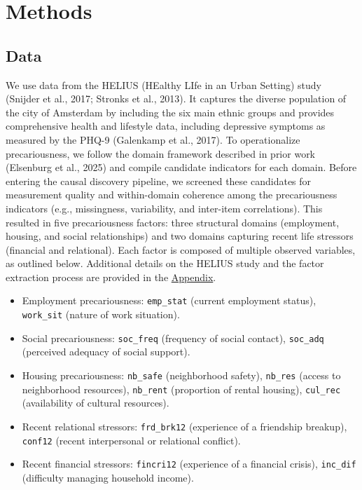\documentclass[
]{article}
\providecommand{\tightlist}{%
  \setlength{\itemsep}{0pt}\setlength{\parskip}{0pt}}\usepackage{longtable,booktabs,array}
\begin{document}
\section{Methods}\label{methods}

\subsection{Data}\label{data}

We use data from the HELIUS (HEalthy LIfe in an Urban Setting) study
(Snijder et al., 2017; Stronks et al., 2013). It captures the diverse
population of the city of Amsterdam by including the six main ethnic
groups and provides comprehensive health and lifestyle data, including
depressive symptoms as measured by the PHQ-9 (Galenkamp et al., 2017).
\textcolor{BrickRed}{To operationalize precariousness, we follow the domain framework described in prior work}
(Elsenburg et al., 2025)
\textcolor{BrickRed}{and compile candidate indicators for each domain. Before entering the causal discovery pipeline, we screened these candidates for measurement quality and within-domain coherence among the precariousness indicators (e.g., missingness, variability, and inter-item correlations). 
This resulted in five precariousness factors: three structural domains (employment, housing, and social relationships) and two domains capturing recent life stressors (financial and relational). Each factor is composed of multiple observed variables, as outlined below. Additional details on the HELIUS study and the factor extraction process are provided in the}
\hyperref[sec-appendix]{Appendix}.

\begin{itemize}
\tightlist
\item
  Employment precariousness: \texttt{emp\_stat} (current employment
  status), \texttt{work\_sit} (nature of work situation).
\item
  Social precariousness: \texttt{soc\_freq} (frequency of social
  contact), \texttt{soc\_adq} (perceived adequacy of social support).
\item
  Housing precariousness: \texttt{nb\_safe} (neighborhood safety),
  \texttt{nb\_res} (access to neighborhood resources), \texttt{nb\_rent}
  (proportion of rental housing), \texttt{cul\_rec} (availability of
  cultural resources).
\item
  Recent relational stressors: \texttt{frd\_brk12} (experience of a
  friendship breakup), \texttt{conf12} (recent interpersonal or
  relational conflict).
\item
  Recent financial stressors: \texttt{fincri12} (experience of a
  financial crisis), \texttt{inc\_dif} (difficulty managing household
  income).
\end{itemize}
\end{document}
